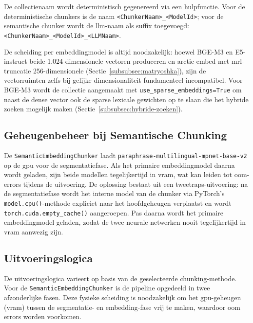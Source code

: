 De collectienaam wordt deterministisch gegenereerd via een hulpfunctie. Voor de deterministische chunkers is de naam \texttt{<ChunkerNaam>\_<ModelId>}; voor de semantische chunker wordt de \gls{llm}-naam als suffix toegevoegd: \texttt{<ChunkerNaam>\_<ModelId>\_<LLMNaam>}.

De scheiding per embeddingmodel is altijd noodzakelijk: hoewel BGE-M3 en E5-instruct beide 1.024-dimensionele vectoren produceren en arctic-embed met \gls{mrl}-truncatie 256-dimensionele (Sectie~\ref{subsubsec:matryoshka}), zijn de vectorruimten zelfs bij gelijke dimensionaliteit fundamenteel incompatibel. Voor BGE-M3 wordt de collectie aangemaakt met \texttt{use\_sparse\_embeddings=True} om naast de dense vector ook de sparse lexicale gewichten op te slaan die het hybride zoeken mogelijk maken (Sectie~\ref{subsubsec:hybride-zoeken}).

\subsection{Geheugenbeheer bij Semantische Chunking}

De \texttt{SemanticEmbeddingChunker} laadt \texttt{paraphrase-multilingual-mpnet-base-v2} op de \gls{gpu} voor de segmentatiefase. Als het primaire embeddingmodel daarna wordt geladen, zijn beide modellen tegelijkertijd in \gls{vram}, wat kan leiden tot \gls{oom}-errors tijdens de uitvoering. De oplossing bestaat uit een tweetraps-uitvoering: na de segmentatiefase wordt het interne model van de chunker via PyTorch's \texttt{model.cpu()}-methode expliciet naar het hoofdgeheugen verplaatst en wordt \texttt{torch.cuda.empty\_cache()} aangeroepen. Pas daarna wordt het primaire embeddingmodel geladen, zodat de twee neurale netwerken nooit tegelijkertijd in \gls{vram} aanwezig zijn.

\subsection{Uitvoeringslogica}

De uitvoeringslogica varieert op basis van de geselecteerde chunking-methode. Voor de \texttt{SemanticEmbeddingChunker} is de pipeline opgedeeld in twee afzonderlijke fasen. Deze fysieke scheiding is noodzakelijk om het \gls{gpu}-geheugen (\gls{vram}) tussen de segmentatie- en embedding-fase vrij te maken, waardoor \gls{oom} errors worden voorkomen.

